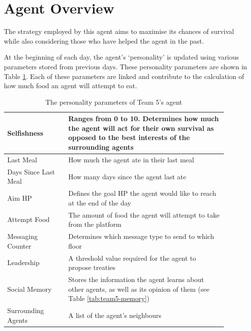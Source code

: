 \section{Agent Overview}
\label{sec:team5-overview}


The strategy employed by this agent aims to maximise its chances of survival while also considering those who have helped the agent in the past.

At the beginning of each day, the agent's `personality' is updated using various parameters stored from previous days. These personality parameters are shown in Table \ref{tab:team5-personality}. Each of these parameters are linked and contribute to the calculation of how much food an agent will attempt to eat.

\begin{table}
    \centering
\begin{tabular}%
    {| >{\raggedleft\arraybackslash}p{0.25\linewidth} | %
    >{\raggedright\arraybackslash}p{0.65\linewidth} | %
    }
    \hline
    Selfishness          & Ranges from 0 to 10. Determines how much the agent will act for their own survival as opposed to the best interests of the surrounding agents\\
    \hline
    Last Meal            & How much the agent ate in their last meal\\
    \hline
    Days Since Last Meal & How many days since the agent last ate\\
    \hline
    Aim HP               & Defines the goal HP the agent would like to reach at the end of the day\\
    \hline
    Attempt Food         & The amount of food the agent will attempt to take from the platform\\
    \hline
    Messaging Counter    & Determines which message type to send to which floor \\
    \hline
    Leadership           & A threshold value required for the agent to propose treaties\\
    \hline
    Social Memory        & Stores the information the agent learns about other agents, as well as its opinion of them (see Table \ref{tab:team5-memory})\\
    \hline
    Surrounding Agents   & A list of the agent's neighbours\\
    \hline
\end{tabular}
\caption{The personality parameters of Team 5's agent}
\label{tab:team5-personality}
\end{table}

